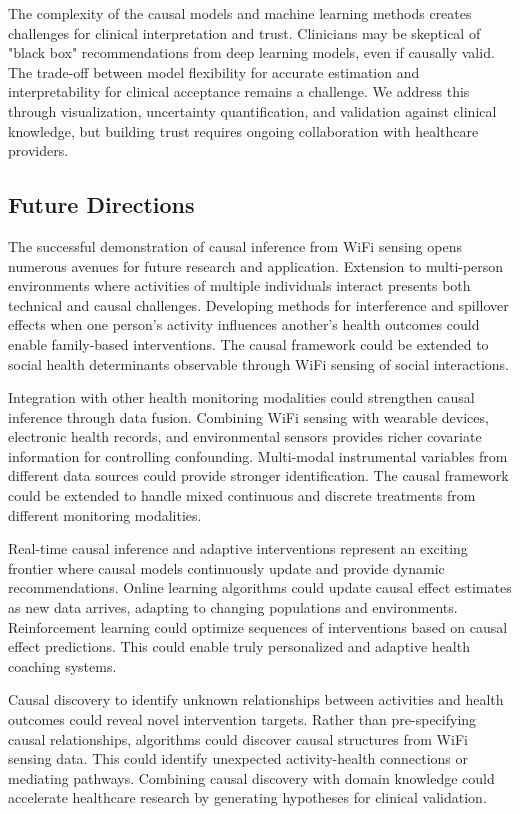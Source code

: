 \documentclass[journal]{IEEEtran}
\begin{document}
The complexity of the causal models and machine learning methods creates challenges for clinical interpretation and trust. Clinicians may be skeptical of "black box" recommendations from deep learning models, even if causally valid. The trade-off between model flexibility for accurate estimation and interpretability for clinical acceptance remains a challenge. We address this through visualization, uncertainty quantification, and validation against clinical knowledge, but building trust requires ongoing collaboration with healthcare providers.

\subsection{Future Directions}

The successful demonstration of causal inference from WiFi sensing opens numerous avenues for future research and application. Extension to multi-person environments where activities of multiple individuals interact presents both technical and causal challenges. Developing methods for interference and spillover effects when one person's activity influences another's health outcomes could enable family-based interventions. The causal framework could be extended to social health determinants observable through WiFi sensing of social interactions.

Integration with other health monitoring modalities could strengthen causal inference through data fusion. Combining WiFi sensing with wearable devices, electronic health records, and environmental sensors provides richer covariate information for controlling confounding. Multi-modal instrumental variables from different data sources could provide stronger identification. The causal framework could be extended to handle mixed continuous and discrete treatments from different monitoring modalities.

Real-time causal inference and adaptive interventions represent an exciting frontier where causal models continuously update and provide dynamic recommendations. Online learning algorithms could update causal effect estimates as new data arrives, adapting to changing populations and environments. Reinforcement learning could optimize sequences of interventions based on causal effect predictions. This could enable truly personalized and adaptive health coaching systems.

Causal discovery to identify unknown relationships between activities and health outcomes could reveal novel intervention targets. Rather than pre-specifying causal relationships, algorithms could discover causal structures from WiFi sensing data. This could identify unexpected activity-health connections or mediating pathways. Combining causal discovery with domain knowledge could accelerate healthcare research by generating hypotheses for clinical validation.
\end{document}

